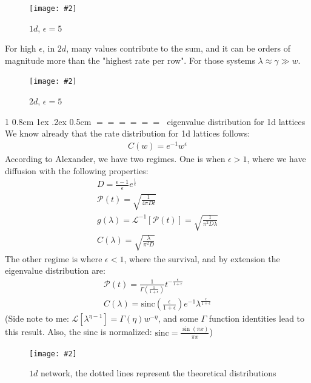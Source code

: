 \documentclass[onecolumn,fleqn,notitlepage,secnumarabic]{revtex4}
\makeatletter
\newcommand{\sinc}{\mbox{sinc}}
\def\section{%
  \@startsection
    {section}%
    {1}%
    {\z@}%
    {0.8cm \@plus1ex \@minus .2ex}%
    {0.5cm}%
    {\Large\bf $=\!=\!=\!=\!=\!=\;$}%
}%
\newcommand{\dontincludegraphics}[2][]{\texttt{[image: \#2]}}
\makeatother
\begin{document}
\begin{figure}[H]
    \dontincludegraphics[clip,width=0.9\hsize]{{{exp_1d_5_pn}}}
    \caption{$1d$, $\epsilon = 5$}
\end{figure}

For high $\epsilon$, in $2d$, many values contribute to the sum, and it can be orders of magnitude more than the "highest rate per row". For those systems $\lambda \approx \gamma \gg w$. 

\begin{figure}[H]
    \dontincludegraphics[clip,width=0.9\hsize]{{{exp_2d_5_pn}}}
    \caption{$2d$, $\epsilon = 5$}
\end{figure}

\section{eigenvalue distribution for 1d lattices}
We know already that the rate distribution for 1d lattices follows:
\begin{align}
C(w) = e^{-1}w^{\epsilon}
\end{align}
According to Alexander, we have two regimes. One is when $\epsilon > 1$, where we have diffusion with the following properties:
\begin{align}
D = \frac{\epsilon-1}{\epsilon}e^{\frac{1}{\epsilon}} \\
\mathcal{P}(t) = \sqrt{\frac{1}{4\pi D t}} \\
g(\lambda) = \mathcal{L}^{-1}[\mathcal{P}(t)] = \sqrt{\frac{1}{\pi^2 D \lambda}} \\ 
C(\lambda) = \sqrt{\frac{\lambda}{\pi^2 D}}
\end{align}
The other regime is where $\epsilon <1 $, where the survival, and by extension the eigenvalue distribution are:
\begin{align}
  \mathcal{P}(t) = \frac{1}{\Gamma\left(\frac{1}{1+\epsilon}\right)}t^{-\frac{\epsilon}{1+\epsilon}} \\
  C(\lambda) = \sinc\left(\frac{\epsilon}{1+\epsilon}\right)e^{-1}\lambda^{\frac{\epsilon}{1+\epsilon}}
\end{align}
(Side note to me: $\mathcal{L}[\lambda^{\eta-1}] = \Gamma(\eta)w^{-\eta}$, and some $\Gamma$ function identities lead to this result. Also, the sinc is normalized: $\sinc=\frac{\sin(\pi x)}{\pi x}$)
\begin{figure}[H]
\dontincludegraphics[clip, width=0.9\hsize]{bloch_1d_2nn_rand_log_eig}
\caption{$1d$ network, the dotted lines represent the theoretical distributions}
\end{figure}
\end{document}
